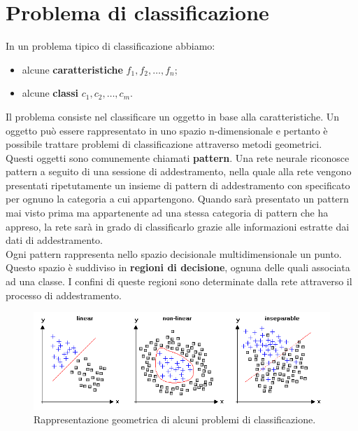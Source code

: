 \chapter{Problema di classificazione} %
\label{cha:problema_di_classificazione}

In un problema tipico di classificazione abbiamo:
\begin{itemize}
    \item alcune \textbf{caratteristiche} $f_1, f_2, \dots,f_n$;
    \item alcune \textbf{classi} $c_1, c_2, \dots, c_m$.
\end{itemize}
Il problema consiste nel classificare un oggetto in base alla caratteristiche. Un oggetto può essere rappresentato in uno spazio n-dimensionale e pertanto è possibile trattare problemi di classificazione attraverso metodi geometrici.\\

Questi oggetti sono comunemente chiamati \textbf{pattern}. Una rete neurale riconosce pattern a seguito di una sessione di addestramento, nella quale alla rete vengono presentati ripetutamente un insieme di pattern di addestramento con specificato per ognuno la categoria a cui appartengono. Quando sarà presentato un pattern mai visto prima ma appartenente ad una stessa categoria di pattern che ha appreso, la rete sarà in grado di classificarlo grazie alle informazioni estratte dai dati di addestramento.\\

Ogni pattern rappresenta nello spazio decisionale multidimensionale un punto. Questo spazio è suddiviso in \textbf{regioni di decisione}, ognuna delle quali associata ad una classe. I confini di queste regioni sono determinate dalla rete attraverso il processo di addestramento.
\begin{figure}[h!]
    \centering
    \includegraphics[width=\textwidth]{images/classify.png}
    \caption{Rappresentazione geometrica di alcuni problemi di classificazione.}
\end{figure}

